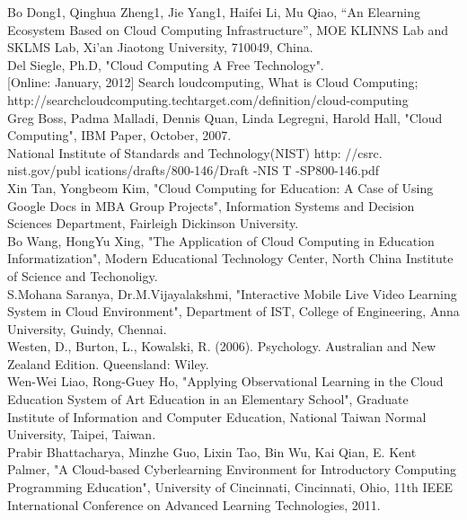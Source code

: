 \documentclass[journal]{IEEEtran}
\begin{document}
\begin{thebibliography}{1}

 Bo Dong1, Qinghua Zheng1, Jie Yang1, Haifei Li, Mu Qiao, “An Elearning Ecosystem Based on Cloud Computing Infrastructure”, MOE KLINNS Lab and SKLMS Lab, Xi'an Jiaotong University, 710049, China.\\
 Del Siegle, Ph.D, "Cloud Computing A Free Technology".\\
 [Online: January, 2012] Search loudcomputing, What is Cloud Computing; http://searchcloudcomputing.techtarget.com/definition/cloud-computing\\
 Greg Boss, Padma Malladi, Dennis Quan, Linda Legregni, Harold Hall, "Cloud Computing", IBM Paper, October, 2007.\\
 National Institute of Standards and Technology(NIST)
http: //csrc. nist.gov/publ ications/drafts/800-146/Draft -NIS T -SP800-146.pdf
\\
 Xin Tan, Yongbeom Kim, "Cloud Computing for Education: A Case of Using Google Docs in MBA Group Projects", Information Systems and Decision Sciences Department, Fairleigh Dickinson University.\\
 Bo Wang, HongYu Xing, "The Application of Cloud Computing in Education Informatization", Modern Educational Technology Center, North China Institute of Science and Techonoligy.\\
 S.Mohana Saranya, Dr.M.Vijayalakshmi, "Interactive Mobile Live Video Learning System in Cloud Environment", Department of IST, College of Engineering, Anna University, Guindy, Chennai.\\
 Westen, D., Burton, L., Kowalski, R. (2006). Psychology. Australian and New Zealand Edition. Queensland: Wiley.\\
 Wen-Wei Liao, Rong-Guey Ho, "Applying Observational Learning in the Cloud Education System of Art Education in an Elementary School", Graduate Institute of Information and Computer Education, National Taiwan Normal University, Taipei, Taiwan.\\
 Prabir Bhattacharya, Minzhe Guo, Lixin Tao, Bin Wu, Kai Qian, E. Kent Palmer, "A Cloud-based Cyberlearning Environment for Introductory Computing Programming Education", University of Cincinnati, Cincinnati, Ohio, 11th IEEE International Conference on Advanced Learning Technologies, 2011.\\

\end{thebibliography}
\end{document}
